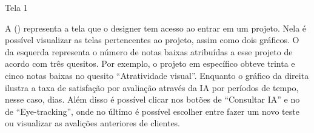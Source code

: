 \begin{photograph}[H]
    \centering
    \caption{Tela 1}%
    \label{phot:pg-tela1}
    \end{photograph}

A () representa a tela que o designer tem acesso ao entrar em um projeto. Nela é possível visualizar as telas pertencentes ao projeto, assim como dois gráficos. O da esquerda representa o número de notas baixas atribuídas a esse projeto de acordo com três quesitos. Por exemplo, o projeto em específico obteve trinta e cinco notas baixas no quesito “Atratividade visual”. Enquanto o gráfico da direita ilustra a taxa de satisfação por avaliação através da IA por períodos de tempo, nesse caso, dias. Além disso é possível clicar nos botões de “Consultar IA” e no de “Eye-tracking”, onde no último é possível escolher entre fazer um novo teste ou visualizar as avalições anteriores de clientes. 

